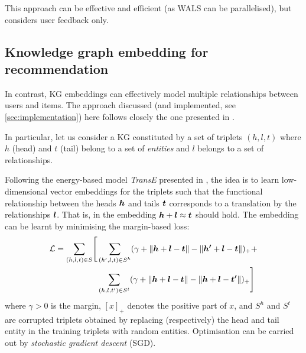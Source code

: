 This approach can be effective and efficient (as WALS can be parallelised), but considers user feedback only.

\subsection{Knowledge graph embedding for recommendation}\label{sec:kgrecom}

In contrast, KG embeddings  can effectively model multiple relationships between users and items.
The approach discussed (and implemented, see \cref{sec:implementation}) here follows closely the one presented in \cite{zhang2018learning}.

In particular, let us consider a KG constituted by a set of triplets $(h, l, t)$ where $h$ (head) and $t$ (tail) belong to a set of \emph{entities} and $l$ belongs to a set of relationships.

Following the energy-based model \emph{TransE}\footnotemark{} presented in \cite{bordes2013translating}, the idea is to learn low-dimensional vector embeddings for the triplets such that the functional relationship between the heads $\boldsymbol{h}$ and tails $\boldsymbol{t}$ corresponds to a translation by the relationships $\boldsymbol{l}$.
That is, in the embedding $\boldsymbol{h} + \boldsymbol{l} \approx \boldsymbol{t}$ should hold.
The embedding can be learnt by minimising the margin-based loss:
\begin{align}\label{eq:transe}
  \mathcal{L} = \sum_{(h, l, t) \in S} \Biggl[ &\sum_{(h', l, t) \in S^h} (\gamma + \left\lVert\boldsymbol{h} + \boldsymbol{l} - \boldsymbol{t}\right\rVert - \left\lVert\boldsymbol{h'} + \boldsymbol{l} - \boldsymbol{t}\right\rVert)_{+} +\\
                                              & \sum_{(h, l, t') \in S^t} (\gamma + \left\lVert\boldsymbol{h} + \boldsymbol{l} - \boldsymbol{t}\right\rVert - \left\lVert\boldsymbol{h} + \boldsymbol{l} - \boldsymbol{t'}\right\rVert)_{+} \Biggr]\nonumber
\end{align}
where $\gamma>0$ is the margin, $[x]_+$ denotes the positive part of $x$, and $S^h$ and $S^t$ are corrupted triplets obtained by replacing (respectively) the head and tail entity in the training triplets with random entities.
Optimisation can be carried out by \emph{stochastic gradient descent} (SGD).


